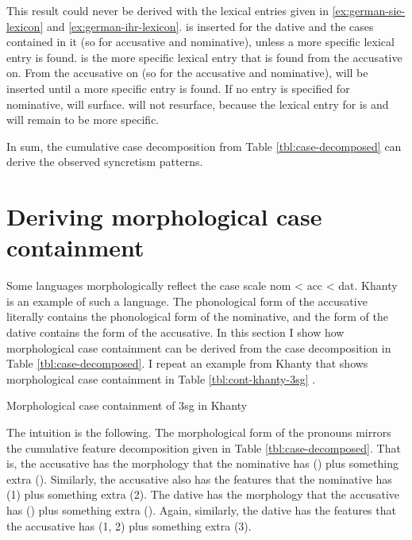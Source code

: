 This result could never be derived with the lexical entries given in \ref{ex:german-sie-lexicon} and \ref{ex:german-ihr-lexicon}.  is inserted for the dative and the cases contained in it (so for accusative and nominative), unless a more specific lexical entry is found.  is the more specific lexical entry that is found from the accusative on. From the accusative on (so for the accusative and nominative),  will be inserted until a more specific entry is found. If no entry is specified for nominative,  will surface.  will not resurface, because the lexical entry for  is and will remain to be more specific.

In sum, the cumulative case decomposition from Table \ref{tbl:case-decomposed} can derive the observed syncretism patterns.

\section{Deriving morphological case containment}

Some languages morphologically reflect the case scale \ac{nom} < \ac{acc} < \ac{dat}. Khanty is an example of such a language. The phonological form of the accusative literally contains the phonological form of the nominative, and the form of the dative contains the form of the accusative. In this section I show how morphological case containment can be derived from the case decomposition in Table \ref{tbl:case-decomposed}. I repeat an example from Khanty that shows morphological case containment in Table \ref{tbl:cont-khanty-3sg} .

\begin{table}[ht]
  \center
  \caption {Morphological case containment of 3\ac{sg} in Khanty}
    
  \label{tbl:cont-khanty-3sg}
\end{table}

The intuition is the following. The morphological form of the pronouns mirrors the cumulative feature decomposition given in Table \ref{tbl:case-decomposed}. That is, the accusative has the morphology that the nominative has () plus something extra (). Similarly, the accusative also has the features that the nominative has (1) plus something extra (2). The dative has the morphology that the accusative has () plus something extra (). Again, similarly, the dative has the features that the accusative has (1, 2) plus something extra (3).


